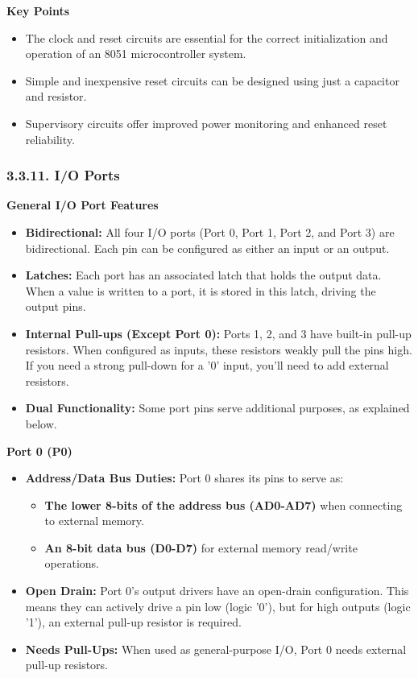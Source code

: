 \documentclass[
]{article}
\begin{document}
\textbf{Key Points}

\begin{itemize}
\item
  The clock and reset circuits are essential for the correct
  initialization and operation of an 8051 microcontroller system.
\item
  Simple and inexpensive reset circuits can be designed using just a
  capacitor and resistor.
\item
  Supervisory circuits offer improved power monitoring and enhanced
  reset reliability.
\end{itemize}

\hypertarget{3311-io-ports}{%
\subsubsection{3.3.11. I/O Ports}\label{3311-io-ports}}

\textbf{General I/O Port Features}

\begin{itemize}
\item
  \textbf{Bidirectional:} All four I/O ports (Port 0, Port 1, Port 2,
  and Port 3) are bidirectional. Each pin can be configured as either an
  input or an output.
\item
  \textbf{Latches:} Each port has an associated latch that holds the
  output data. When a value is written to a port, it is stored in this
  latch, driving the output pins.
\item
  \textbf{Internal Pull-ups (Except Port 0):} Ports 1, 2, and 3 have
  built-in pull-up resistors. When configured as inputs, these resistors
  weakly pull the pins high. If you need a strong pull-down for a '0'
  input, you'll need to add external resistors.
\item
  \textbf{Dual Functionality:} Some port pins serve additional purposes,
  as explained below.
\end{itemize}

\textbf{Port 0 (P0)}

\begin{itemize}
\item
  \textbf{Address/Data Bus Duties:} Port 0 shares its pins to serve as:

  \begin{itemize}
  \item
    \textbf{The lower 8-bits of the address bus (AD0-AD7)} when
    connecting to external memory.
  \item
    \textbf{An 8-bit data bus (D0-D7)} for external memory read/write
    operations.
  \end{itemize}
\item
  \textbf{Open Drain:} Port 0's output drivers have an open-drain
  configuration. This means they can actively drive a pin low (logic
  '0'), but for high outputs (logic '1'), an external pull-up resistor
  is required.
\item
  \textbf{Needs Pull-Ups:} When used as general-purpose I/O, Port 0
  needs external pull-up resistors.
\end{itemize}
\end{document}
